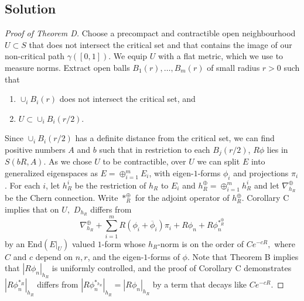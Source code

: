 \documentclass[10pt]{amsart}
\theoremstyle{definition}
\begin{document}
\subsection{Solution}
\begin{proof}[Proof of Theorem D]
Choose a precompact and contractible open neighbourhood $U\subset S$ that does not intersect the critical set and that contains the image of our non-critical path $\gamma([0,1])$. We equip $U$ with a flat metric, which we use to measure norms. Extract open balls $B_1(r),\dots, B_m(r)$ of small radius $r>0$ such that 
\begin{enumerate}
    \item $\cup_i B_i(r)$ does not intersect the critical set, and 
    \item $U\subset \cup_i B_i(r/2)$.
\end{enumerate}
Since $\cup_i B_i(r/2)$ has a definite distance from the critical set, we can find positive numbers $A$ and $b$ such that in restriction to each $B_j(r/2)$, $R\phi$ lies in $S(bR,A)$. As we chose $U$ to be contractible, over $U$ we can split $E$ into generalized eigenspaces as $E = \oplus_{i=1}^m E_i$, with eigen-$1$-forms $\phi_i$ and projections $\pi_i$. For each $i$, let $h_R^i$ be the restriction of $h_R$ to $E_i$ and $h_R^{\oplus}=\oplus_{i=1}^m h_R^i$ and let $\nabla_{h_R}^{\oplus}$ be the  Chern connection. Write $*_R^{\oplus}$ for the adjoint operator of $h_R^{\oplus}.$ Corollary C implies that on $U,$ $D_{h_R}$ differs from
\begin{equation}\label{connectionestimate}
    \nabla_{h_R}^{\oplus} +\sum_{i=1}^m R(\phi_i+\overline{\phi}_i)\pi_i + R\phi_n+R\phi_n^{*_R^{\oplus}}
\end{equation}
by an $\textrm{End}(E|_U)$ valued $1$-form whose $h_R$-norm is on the order of $Ce^{-cR},$ where $C$ and $c$ depend on $n,r$, and the eigen-$1$-forms of $\phi$. Note that Theorem B implies that $|R\phi_n|_{h_R}$ is uniformly controlled, and the proof of Corollary C demonstrates $|R\phi_n^{*_R}|_{h_R}$ differs from $|R\phi_n^{*_{h_R}}|_{h_R}=|R\phi_n|_{h_R}$ by a term that decays like $Ce^{-cR}.$


\end{proof}
\end{document}
